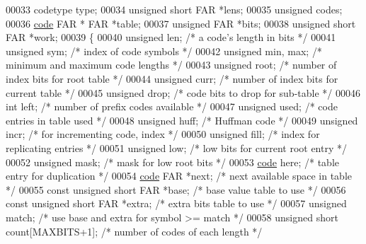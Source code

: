 \begin{DoxyCode}
00033 codetype type;
00034 \textcolor{keywordtype}{unsigned} \textcolor{keywordtype}{short} FAR *lens;
00035 \textcolor{keywordtype}{unsigned} codes;
00036 \hyperlink{structcode}{code} FAR * FAR *table;
00037 \textcolor{keywordtype}{unsigned} FAR *bits;
00038 \textcolor{keywordtype}{unsigned} \textcolor{keywordtype}{short} FAR *work;
00039 \{
00040     \textcolor{keywordtype}{unsigned} len;               \textcolor{comment}{/* a code's length in bits */}
00041     \textcolor{keywordtype}{unsigned} sym;               \textcolor{comment}{/* index of code symbols */}
00042     \textcolor{keywordtype}{unsigned} min, max;          \textcolor{comment}{/* minimum and maximum code lengths */}
00043     \textcolor{keywordtype}{unsigned} root;              \textcolor{comment}{/* number of index bits for root table */}
00044     \textcolor{keywordtype}{unsigned} curr;              \textcolor{comment}{/* number of index bits for current table */}
00045     \textcolor{keywordtype}{unsigned} drop;              \textcolor{comment}{/* code bits to drop for sub-table */}
00046     \textcolor{keywordtype}{int} left;                   \textcolor{comment}{/* number of prefix codes available */}
00047     \textcolor{keywordtype}{unsigned} used;              \textcolor{comment}{/* code entries in table used */}
00048     \textcolor{keywordtype}{unsigned} huff;              \textcolor{comment}{/* Huffman code */}
00049     \textcolor{keywordtype}{unsigned} incr;              \textcolor{comment}{/* for incrementing code, index */}
00050     \textcolor{keywordtype}{unsigned} fill;              \textcolor{comment}{/* index for replicating entries */}
00051     \textcolor{keywordtype}{unsigned} low;               \textcolor{comment}{/* low bits for current root entry */}
00052     \textcolor{keywordtype}{unsigned} mask;              \textcolor{comment}{/* mask for low root bits */}
00053     \hyperlink{structcode}{code} here;                  \textcolor{comment}{/* table entry for duplication */}
00054     \hyperlink{structcode}{code} FAR *next;             \textcolor{comment}{/* next available space in table */}
00055     \textcolor{keyword}{const} \textcolor{keywordtype}{unsigned} \textcolor{keywordtype}{short} FAR *base;     \textcolor{comment}{/* base value table to use */}
00056     \textcolor{keyword}{const} \textcolor{keywordtype}{unsigned} \textcolor{keywordtype}{short} FAR *extra;    \textcolor{comment}{/* extra bits table to use */}
00057     \textcolor{keywordtype}{unsigned} match;             \textcolor{comment}{/* use base and extra for symbol >= match */}
00058     \textcolor{keywordtype}{unsigned} \textcolor{keywordtype}{short} count[MAXBITS+1];    \textcolor{comment}{/* number of codes of each length */}

\end{DoxyCode}
